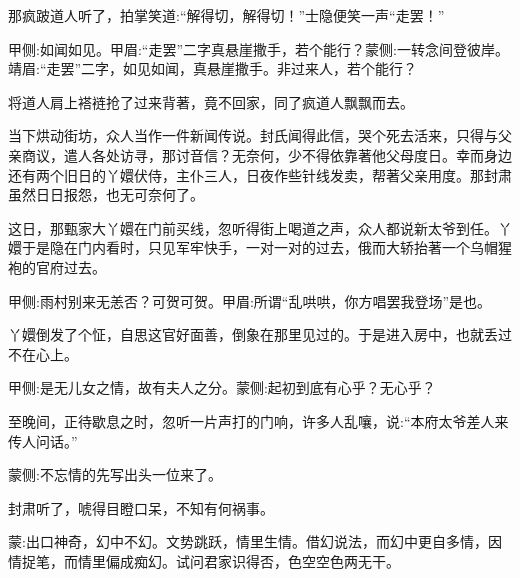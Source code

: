 \begin{parag}
    那疯跛道人听了，拍掌笑道:“解得切，解得切！”士隐便笑一声“走罢！”\begin{note}甲侧:如闻如见。甲眉:“走罢”二字真悬崖撒手，若个能行？蒙侧:一转念间登彼岸。靖眉:“走罢”二字，如见如闻，真悬崖撒手。非过来人，若个能行？\end{note}将道人肩上褡裢抢了过来背著，竟不回家，同了疯道人飘飘而去。
\end{parag}


\begin{parag}
    当下烘动街坊，众人当作一件新闻传说。封氏闻得此信，哭个死去活来，只得与父亲商议，遣人各处访寻，那讨音信？无奈何，少不得依靠著他父母度日。幸而身边还有两个旧日的丫嬛伏侍，主仆三人，日夜作些针线发卖，帮著父亲用度。那封肃虽然日日报怨，也无可奈何了。
\end{parag}


\begin{parag}
    这日，那甄家大丫嬛在门前买线，忽听得街上喝道之声，众人都说新太爷到任。丫嬛于是隐在门内看时，只见军牢快手，一对一对的过去，俄而大轿抬著一个乌帽猩袍的官府过去。\begin{note}甲侧:雨村别来无恙否？可贺可贺。甲眉:所谓“乱哄哄，你方唱罢我登场”是也。\end{note}丫嬛倒发了个怔，自思这官好面善，倒象在那里见过的。于是进入房中，也就丢过不在心上。\begin{note}甲侧:是无儿女之情，故有夫人之分。蒙侧:起初到底有心乎？无心乎？\end{note}至晚间，正待歇息之时，忽听一片声打的门响，许多人乱嚷，说:“本府太爷差人来传人问话。”\begin{note}蒙侧:不忘情的先写出头一位来了。\end{note}封肃听了，唬得目瞪口呆，不知有何祸事。
\end{parag}


\begin{parag}
    \begin{note}蒙:出口神奇，幻中不幻。文势跳跃，情里生情。借幻说法，而幻中更自多情，因情捉笔，而情里偏成痴幻。试问君家识得否，色空空色两无干。\end{note}
\end{parag}


